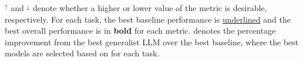\begin{table*}[h!]
\begin{small}
\begin{threeparttable}
\begin{tabular}
\bottomrule
\end{tabular}



\begin{tablenotes}
\footnotesize
\item $^\uparrow$ and $^\downarrow$ denote whether a higher or lower value of the metric is desirable, respectively.
For each task,
the best baseline performance is \underline{underlined} 
and the best overall performance is in \textbf{bold}
for each metric.
{\ImpG} denotes the percentage improvement from the \colorbox{blue!10}{best generalist LLM} over the 
\colorbox{yellow!20}{best baseline},
where the best models are selected based on {\SR} for each task.
\end{tablenotes}

\end{threeparttable}
\end{small}
\end{table*}